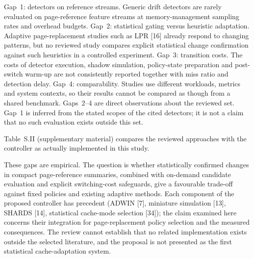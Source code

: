 \documentclass[journal,onecolumn]{IEEEtran}
\begin{document}
Gap~1: detectors on reference streams. Generic drift detectors are rarely
evaluated on page-reference feature streams at memory-management sampling
rates and overhead budgets. Gap~2: statistical gating versus heuristic
adaptation. Adaptive page-replacement studies such as LPR [16] already respond
to changing patterns, but no reviewed study compares explicit statistical
change confirmation against such heuristics in a controlled experiment.
Gap~3: transition costs. The costs of detector execution, shadow simulation,
policy-state preparation and post-switch warm-up are not consistently reported
together with miss ratio and detection delay. Gap~4: comparability. Studies use
different workloads, metrics and system contexts, so their results cannot be
compared as though from a shared benchmark. Gaps~2--4 are direct observations
about the reviewed set. Gap~1 is inferred from the stated scopes of the cited
detectors; it is not a claim that no such evaluation exists outside this set.

Table~S.II (supplementary material) compares the reviewed approaches with
the controller as actually implemented in this study.



These gaps are empirical. The question is whether statistically confirmed
changes in compact page-reference summaries, combined with on-demand candidate
evaluation and explicit switching-cost safeguards, give a favourable trade-off
against fixed policies and existing adaptive methods. Each component of the
proposed controller has precedent (ADWIN [7], miniature simulation [13],
SHARDS [14], statistical cache-mode selection [34]); the claim examined here
concerns their integration for page-replacement policy selection and the
measured consequences. The review cannot establish that no related
implementation exists outside the selected literature, and the proposal is not
presented as the first statistical cache-adaptation system.
\end{document}
